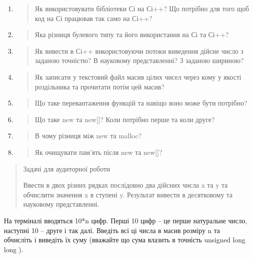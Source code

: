 \documentclass[]{article}
\begin{document}
\begin{enumerate}
\def\labelenumi{\arabic{enumi})}
\item
  \begin{quote}
  Як використовувати бібліотеки Сі на Сі++? Що потрібно для того щоб код
  на Сі працював так само на Сі++?
  \end{quote}
\item
  \begin{quote}
  Яка різниця булевого типу та його використання на Сі та Сі++?
  \end{quote}
\item
  \begin{quote}
  Як вивести в Сі++ використовуючи потоки виведення дійсне число з
  заданою точністю? В науковому представленні? З заданою шириною?
  \end{quote}
\item
  \begin{quote}
  Як записати у текстовий файл масив цілих чисел через кому у якості
  роздільника та прочитати потім цей масив?
  \end{quote}
\item
  \begin{quote}
  Що таке перевантаження функцій та навіщо воно може бути потрібно?
  \end{quote}
\item
  \begin{quote}
  Що таке new та new{[}{]}? Коли потрібно перше та коли друге?
  \end{quote}
\item
  \begin{quote}
  В чому різниця між new та malloc?
  \end{quote}
\item
  \begin{quote}
  Як очищувати пам'ять після new та new{[}{]}?
  \end{quote}
\end{enumerate}

\begin{quote}
Задачі для аудиторної роботи

Ввести в двох різних рядках послідовно два дійсних числа x та y та
обчислити значення x в ступені y. Результат вивести в десятковому та
науковому представленні.
\end{quote}

На терміналі вводяться 10*n цифр. Перші 10 цифр -- це перше натуральне
число, наступні 10 -- друге і так далі. Введіть всі ці числа в масив
розміру n та обчисліть і виведіть їх суму (вважайте що сума влазить в
точність unsigned long long ).
\end{document}
